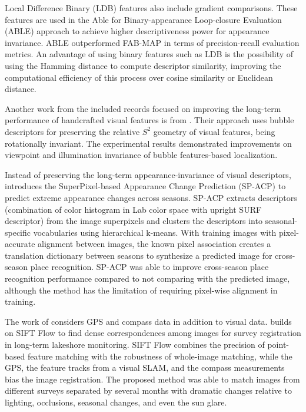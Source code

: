 Local Difference Binary (LDB) features also include gradient comparisons. These features are used in the Able for Binary-appearance Loop-closure Evaluation (ABLE) \parencite{arroyo-et-al:2018:7} approach to achieve higher descriptiveness power for appearance invariance.
ABLE outperformed FAB-MAP in terms of precision-recall evaluation metrics. An advantage of using binary features such as LDB is the possibility of using the Hamming distance to compute descriptor similarity, improving the computational efficiency of this process over cosine similarity or Euclidean distance.

Another work from the included records focused on improving the long-term performance of handcrafted visual features is from \cite{karaoguz-bozma:2016:4}. Their approach uses bubble descriptors for preserving the relative $S^2$ geometry of visual features, being rotationally invariant. The experimental results demonstrated improvements on viewpoint and illumination invariance of bubble features-based localization.

Instead of preserving the long-term appearance-invariance of visual descriptors, \cite{neubert-et-al:2015:005} introduces the SuperPixel-based Appearance Change Prediction (SP-ACP) to predict extreme appearance changes across seasons.
SP-ACP extracts descriptors (combination of color histogram in Lab color space with upright SURF descriptor) from the image superpixels and clusters the descriptors into seasonal-specific vocabularies using hierarchical k-means.
With training images with pixel-accurate alignment between images, the known pixel association creates a translation dictionary between seasons to synthesize a predicted image for cross-season place recognition.
SP-ACP was able to improve cross-season place recognition performance compared to not comparing with the predicted image, although the method has the limitation of requiring pixel-wise alignment in training.

The work of \cite{griffith-pradalier:2017:21664} considers GPS and compass data in addition to visual data. \cite{griffith-pradalier:2017:21664} builds on SIFT Flow to find dense correspondences among images for survey registration in long-term lakeshore monitoring. SIFT Flow combines the precision of point-based feature matching with the robustness of whole-image matching, while the GPS, the feature tracks from a visual SLAM, and the compass measurements bias the image registration. The proposed method was able to match images from different surveys separated by several months with dramatic changes relative to lighting, occlusions, seasonal changes, and even the sun glare.

